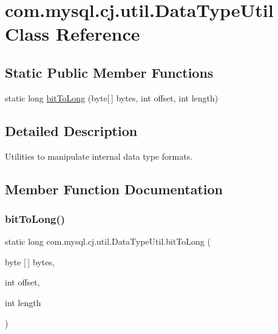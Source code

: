 \hypertarget{classcom_1_1mysql_1_1cj_1_1util_1_1_data_type_util}{}\section{com.\+mysql.\+cj.\+util.\+Data\+Type\+Util Class Reference}
\label{classcom_1_1mysql_1_1cj_1_1util_1_1_data_type_util}
\subsection*{Static Public Member Functions}
\begin{DoxyCompactItemize}
\item 
static long \mbox{\hyperlink{classcom_1_1mysql_1_1cj_1_1util_1_1_data_type_util_a465faef59907df798d9a93bbf796d524}{bit\+To\+Long}} (byte\mbox{[}$\,$\mbox{]} bytes, int offset, int length)
\end{DoxyCompactItemize}


\subsection{Detailed Description}
Utilities to manipulate internal data type formats. 

\subsection{Member Function Documentation}
\mbox{\label{classcom_1_1mysql_1_1cj_1_1util_1_1_data_type_util_a465faef59907df798d9a93bbf796d524}} 
\subsubsection{\texorpdfstring{bit\+To\+Long()}{bitToLong()}}
{\footnotesize\ttfamily static long com.\+mysql.\+cj.\+util.\+Data\+Type\+Util.\+bit\+To\+Long (\begin{DoxyParamCaption}\item[{byte \mbox{[}$\,$\mbox{]}}]{bytes,  }\item[{int}]{offset,  }\item[{int}]{length }\end{DoxyParamCaption})\hspace{0.3cm}{\ttfamily [static]}}

